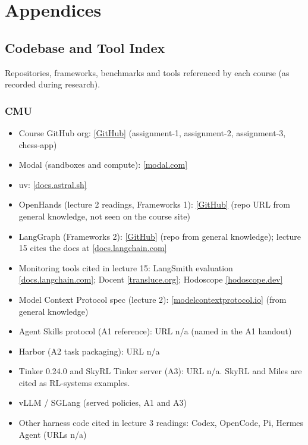 \documentclass[10pt,oneside]{report}
\begin{document}
\part{Appendices}
\chapter{Codebase and Tool Index}
Repositories, frameworks, benchmarks and tools referenced by each course (as recorded during research).
\section{CMU}
{\small\begin{itemize}
\item Course GitHub org: \href{https://github.com/cmu-agents}{[GitHub]} (assignment-1, assignment-2, assignment-3, chess-app)
\item Modal (sandboxes and compute): \href{https://modal.com}{[modal.com]}
\item uv: \href{https://docs.astral.sh/uv}{[docs.astral.sh]}
\item OpenHands (lecture 2 readings, Frameworks 1): \href{https://github.com/All-Hands-AI/OpenHands}{[GitHub]} (repo URL from general knowledge, not seen on the course site)
\item LangGraph (Frameworks 2): \href{https://github.com/langchain-ai/langgraph}{[GitHub]} (repo from general knowledge); lecture 15 cites the docs at \href{https://docs.langchain.com/oss/python/langgraph/overview}{[docs.langchain.com]}
\item Monitoring tools cited in lecture 15: LangSmith evaluation \href{https://docs.langchain.com/langsmith/evaluation}{[docs.langchain.com]}; Docent \href{https://transluce.org/docent}{[transluce.org]}; Hodoscope \href{https://hodoscope.dev}{[hodoscope.dev]}
\item Model Context Protocol spec (lecture 2): \href{https://modelcontextprotocol.io}{[modelcontextprotocol.io]} (from general knowledge)
\item Agent Skills protocol (A1 reference): URL n/a (named in the A1 handout)
\item Harbor (A2 task packaging): URL n/a
\item Tinker 0.24.0 and SkyRL Tinker server (A3): URL n/a. SkyRL and Miles are cited as RL-systems examples.
\item vLLM / SGLang (served policies, A1 and A3)
\item Other harness code cited in lecture 3 readings: Codex, OpenCode, Pi, Hermes Agent (URLs n/a)
\end{itemize}}
\end{document}
